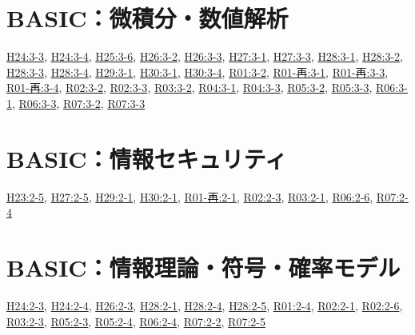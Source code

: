 \section{BASIC：微積分・数値解析}
\hyperref[q:h24-reg-basic-3-3]{H24:3-3}, \hyperref[q:h24-reg-basic-3-4]{H24:3-4}, \hyperref[q:h25-reg-basic-3-6]{H25:3-6}, \hyperref[q:h26-reg-basic-3-2]{H26:3-2}, \hyperref[q:h26-reg-basic-3-3]{H26:3-3}, \hyperref[q:h27-reg-basic-3-1]{H27:3-1}, \hyperref[q:h27-reg-basic-3-3]{H27:3-3}, \hyperref[q:h28-reg-basic-3-1]{H28:3-1}, \hyperref[q:h28-reg-basic-3-2]{H28:3-2}, \hyperref[q:h28-reg-basic-3-3]{H28:3-3}, \hyperref[q:h28-reg-basic-3-4]{H28:3-4}, \hyperref[q:h29-reg-basic-3-1]{H29:3-1}, \hyperref[q:h30-reg-basic-3-1]{H30:3-1}, \hyperref[q:h30-reg-basic-3-4]{H30:3-4}, \hyperref[q:r01-reg-basic-3-2]{R01:3-2}, \hyperref[q:r01-ret-basic-3-1]{R01-再:3-1}, \hyperref[q:r01-ret-basic-3-3]{R01-再:3-3}, \hyperref[q:r01-ret-basic-3-4]{R01-再:3-4}, \hyperref[q:r02-reg-basic-3-2]{R02:3-2}, \hyperref[q:r02-reg-basic-3-3]{R02:3-3}, \hyperref[q:r03-reg-basic-3-2]{R03:3-2}, \hyperref[q:r04-reg-basic-3-1]{R04:3-1}, \hyperref[q:r04-reg-basic-3-3]{R04:3-3}, \hyperref[q:r05-reg-basic-3-2]{R05:3-2}, \hyperref[q:r05-reg-basic-3-3]{R05:3-3}, \hyperref[q:r06-reg-basic-3-1]{R06:3-1}, \hyperref[q:r06-reg-basic-3-3]{R06:3-3}, \hyperref[q:r07-reg-basic-3-2]{R07:3-2}, \hyperref[q:r07-reg-basic-3-3]{R07:3-3}
\section{BASIC：情報セキュリティ}
\hyperref[q:h23-reg-basic-2-5]{H23:2-5}, \hyperref[q:h27-reg-basic-2-5]{H27:2-5}, \hyperref[q:h29-reg-basic-2-1]{H29:2-1}, \hyperref[q:h30-reg-basic-2-1]{H30:2-1}, \hyperref[q:r01-ret-basic-2-1]{R01-再:2-1}, \hyperref[q:r02-reg-basic-2-3]{R02:2-3}, \hyperref[q:r03-reg-basic-2-1]{R03:2-1}, \hyperref[q:r06-reg-basic-2-6]{R06:2-6}, \hyperref[q:r07-reg-basic-2-4]{R07:2-4}
\section{BASIC：情報理論・符号・確率モデル}
\hyperref[q:h24-reg-basic-2-3]{H24:2-3}, \hyperref[q:h24-reg-basic-2-4]{H24:2-4}, \hyperref[q:h26-reg-basic-2-3]{H26:2-3}, \hyperref[q:h28-reg-basic-2-1]{H28:2-1}, \hyperref[q:h28-reg-basic-2-4]{H28:2-4}, \hyperref[q:h28-reg-basic-2-5]{H28:2-5}, \hyperref[q:r01-reg-basic-2-4]{R01:2-4}, \hyperref[q:r02-reg-basic-2-1]{R02:2-1}, \hyperref[q:r02-reg-basic-2-6]{R02:2-6}, \hyperref[q:r03-reg-basic-2-3]{R03:2-3}, \hyperref[q:r05-reg-basic-2-3]{R05:2-3}, \hyperref[q:r05-reg-basic-2-4]{R05:2-4}, \hyperref[q:r06-reg-basic-2-4]{R06:2-4}, \hyperref[q:r07-reg-basic-2-2]{R07:2-2}, \hyperref[q:r07-reg-basic-2-5]{R07:2-5}
